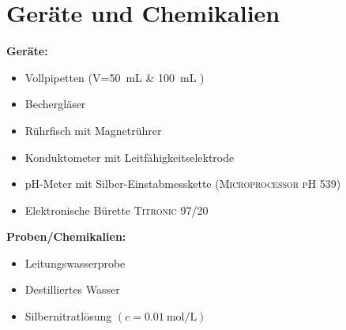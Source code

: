 \newpage
\section{Geräte und Chemikalien}
\label{sec:geraete}

\textbf{Geräte:}
\begin{itemize}
\item Vollpipetten (V=\SI{50}{\milli \liter } \& \SI{100}{\milli \liter } )
\item Bechergläser
\item Rührfisch mit Magnetrührer
\item Konduktometer mit Leitfähigkeitselektrode
\item pH-Meter mit Silber-Einstabmesskette (\textsc{Microprocessor pH 539})
\item Elektronische Bürette \textsc{Titronic 97/20}
\end{itemize}

\vspace*{5mm}

\textbf{Proben/Chemikalien:}
\begin{itemize}
\item Leitungswasserprobe
\item Destilliertes Wasser
\item Silbernitratlösung $\left(c=\SI{0,01}{\mol \per \liter}\right)$
\end{itemize}





